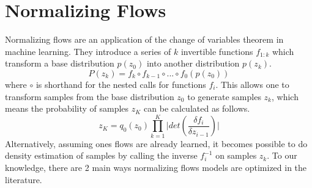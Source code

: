


\section{Normalizing Flows}

Normalizing flows are an application of the change of variables theorem in machine learning. They introduce a series of  $k$ invertible functions $f_{1:k}$ which transform a base distribution $p(z_{0})$ into another distribution $p(z_{k})$. 
\begin{equation}
P(z_{k}) = f_{k} \circ f_{k-1} \circ ... \circ f_{0}(p(z_{0}))
\end{equation} 
where $\circ$ is shorthand for the nested calls for functions $f_{i}$. This allows one to transform samples from the base distribution $z_{0}$ to generate samples $z_{k}$, which means the probability of samples $z_{K}$ can be calculated as follows. 
\begin{equation}
	z_{K} = q_{0}(z_{0}) \prod_{k=1}^{K} \bigg|det (\frac{\delta f_{i}}{\delta z_{i-1}}) \bigg|
\end{equation}
Alternatively, assuming ones flows are already learned, it becomes possible to do density estimation of samples by calling the inverse $f_{i}^{-1}$ on samples $z_{k}$. To our knowledge, there are 2 main ways normalizing flows models are optimized in the literature. 

